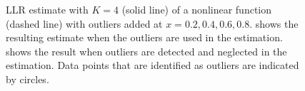 \begin{figure}[htbp]
	\centering
	\caption[Outlier detection in \ac{LLR}]{\ac{LLR} estimate with $K=4$ (solid line) of a nonlinear function (dashed line) with outliers added at $x=0.2,0.4,0.6,0.8$.  shows the resulting estimate when the outliers are used in the estimation.  shows the result when outliers are detected and neglected in the estimation. Data points that are identified as outliers are indicated by circles.}
	\label{fig:LLR-outlierdetection}
\end{figure}



